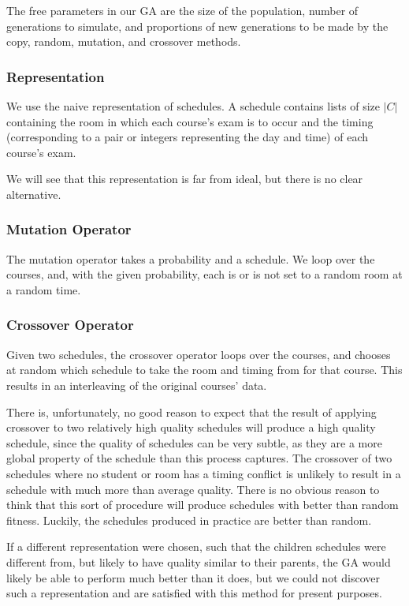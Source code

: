 \documentclass[letterpaper]{article}
\begin{document}
      The free parameters in our GA are the size of the population, number of
      generations to simulate, and proportions of new generations to be made by the copy, 
      random, mutation, and crossover methods.
            
    \subsubsection{Representation}
      We use the naive representation of schedules. A schedule contains lists of size $|C|$
      containing the room in which each course's exam is to occur and the timing
      (corresponding to a pair or integers representing the day and time) of each course's
      exam. 
      
      We will see that this representation is far from ideal, but there is no clear 
      alternative.
            
    \subsubsection{Mutation Operator}
      The mutation operator takes a probability and a schedule. We loop over the courses,
      and, with the given probability, each is or is not set to a random room at a random time.
      
    \subsubsection{Crossover Operator}
      Given two schedules, the crossover operator loops over the courses, and chooses at
      random which schedule to take the room and timing from for that course. This results 
      in an interleaving of the original courses' data.
      
      There is, unfortunately, no good reason to expect that the result of applying 
      crossover to two relatively high quality schedules will produce a high quality 
      schedule, since the quality of schedules can be very subtle, as they are a more 
      global property of the schedule than this process captures. The crossover of two 
      schedules where no student or room has a timing conflict is unlikely to result in 
      a schedule with much more than average quality. There is no obvious reason to think 
      that this sort of procedure will produce schedules with better than random fitness. 
      Luckily, the schedules produced in practice are better than random.
      
      If a different representation were chosen, such that the children schedules were
      different from, but likely to have quality similar to their parents, the GA would 
      likely be able to perform much better than it does, but we could not discover such a
      representation and are satisfied with this method for present purposes.
      
\end{document}
